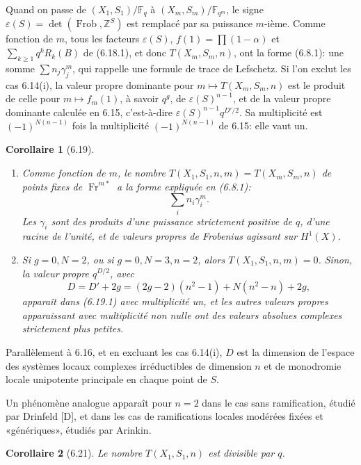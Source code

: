 \documentclass[10pt]{article}
\newcommand{\Fq}{\mathbb F_q}
\newcommand{\Fb}{\mathbb F}
\newcommand{\Z}{\mathbb Z}
\newcommand{\Fr}{\operatorname{Fr}}
\newcommand{\Frob}{\operatorname{Frob}}
\theoremstyle{deligne}
\newtheorem*{corollary*}{Corollaire}
\newcommand{\heading}[1]{\vspace{0.7em}\noindent{\bfseries #1}\quad}
\begin{document}
Quand on passe de $(X_1,S_1)/\Fq$ à $(X_m,S_m)/\Fb_{q^m}$, le signe $\varepsilon(S)=\det(\Frob,\Z^S)$ est remplacé par sa puissance $m$-ième. Comme fonction de $m$, tous les facteurs $\varepsilon(S)$, $f(1)=\prod(1-\alpha)$ et $\sum_{k\ge1}q^kR_k(B)$ de (6.18.1), et donc $T(X_m,S_m,n)$, ont la forme (6.8.1): une somme $\sum n_j\gamma_j^m$, qui rappelle une formule de trace de Lefschetz. Si l'on exclut les cas 6.14(i), la valeur propre dominante pour $m\mapsto T(X_m,S_m,n)$ est le produit de celle pour $m\mapsto f_m(1)$, à savoir $q^g$, de $\varepsilon(S)^{n-1}$, et de la valeur propre dominante calculée en 6.15, c'est-à-dire $\varepsilon(S)^{n-1}q^{D'/2}$. Sa multiplicité est $(-1)^{N(n-1)}$ fois la multiplicité $(-1)^{N(n-1)}$ de 6.15: elle vaut un.

\begin{corollary*}[6.19]
\begin{enumerate}[label=(\roman*)]
\item Comme fonction de $m$, le nombre $T(X_1,S_1,n,m)=T(X_m,S_m,n)$ de points fixes de $\Fr^{m*}$ a la forme expliquée en (6.8.1):
\begin{equation}\tag{6.19.1}
\sum_i n_i\gamma_i^m.
\end{equation}
Les $\gamma_i$ sont des produits d'une puissance strictement positive de $q$, d'une racine de l'unité, et de valeurs propres de Frobenius agissant sur $H^1(X)$.
\item Si $g=0,N=2$, ou si $g=0,N=3,n=2$, alors $T(X_1,S_1,n,m)=0$. Sinon, la valeur propre $q^{D/2}$, avec
\[
D=D'+2g=(2g-2)(n^2-1)+N(n^2-n)+2g,
\]
apparaît dans (6.19.1) avec multiplicité un, et les autres valeurs propres apparaissant avec multiplicité non nulle ont des valeurs absolues complexes strictement plus petites.
\end{enumerate}
\end{corollary*}

\heading{6.20.} Parallèlement à 6.16, et en excluant les cas 6.14(i), $D$ est la dimension de l'espace des systèmes locaux complexes irréductibles de dimension $n$ et de monodromie locale unipotente principale en chaque point de $S$.

Un phénomène analogue apparaît pour $n=2$ dans le cas sans ramification, étudié par Drinfeld [D], et dans les cas de ramifications locales modérées fixées et «génériques», étudiés par Arinkin.

\begin{corollary*}[6.21]
Le nombre $T(X_1,S_1,n)$ est divisible par $q$.
\end{corollary*}
\end{document}
